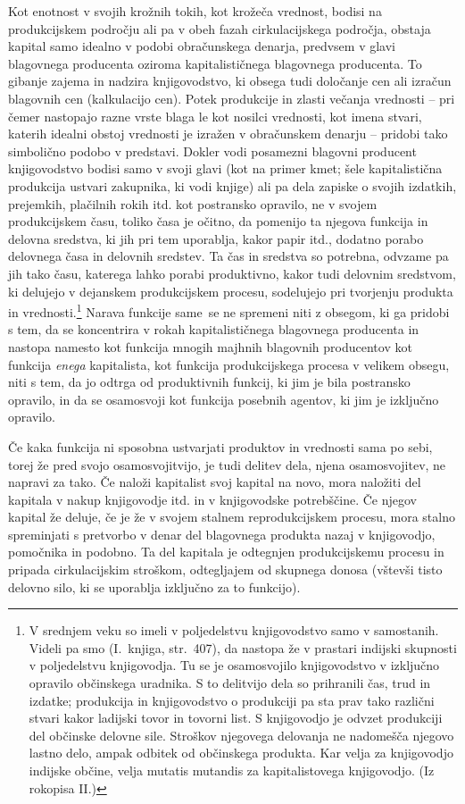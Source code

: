\documentclass[kapital_02.tex]{subfiles}
\begin{document}
Kot enotnost v svojih krožnih tokih, kot krožeča vrednost, bodisi na produkcijskem področju ali pa v obeh fazah cirkulacijskega področja, obstaja kapital samo idealno v podobi obračunskega denarja, predvsem v glavi blagovnega producenta oziroma kapitalističnega blagovnega producenta.
To gibanje zajema in nadzira knjigovodstvo, ki obsega tudi določanje cen ali izračun blagovnih cen (kalkulacijo cen).
Potek produkcije in zlasti večanja vrednosti -- pri čemer nastopajo razne vrste blaga le kot nosilci vrednosti, kot imena stvari, katerih idealni obstoj vrednosti je izražen v obračunskem denarju -- pridobi tako simbolično podobo v predstavi.
Dokler vodi posamezni blagovni producent knjigovodstvo bodisi samo v svoji glavi (kot na primer kmet; šele kapitalistična produkcija ustvari zakupnika, ki vodi knjige) ali pa dela zapiske o svojih izdatkih, prejemkih, plačilnih rokih itd. kot postransko opravilo, ne v svojem produkcijskem času, toliko časa je očitno, da pomenijo ta njegova funkcija in delovna sredstva, ki jih pri tem uporablja, kakor papir itd., dodatno porabo delovnega časa in delovnih sredstev.
Ta čas in sredstva so potrebna, odvzame pa jih tako času, katerega lahko porabi produktivno, kakor tudi delovnim sredstvom, ki delujejo v dejanskem produkcijskem procesu, sodelujejo pri tvorjenju produkta in vrednosti.\footnote
{V srednjem veku so imeli v poljedelstvu knjigovodstvo samo v samostanih.
Videli pa smo (I.\ knjiga, str.\ 407), da nastopa že v prastari indijski skupnosti v poljedelstvu knjigovodja.
Tu se je osamosvojilo knjigovodstvo v izključno opravilo občinskega uradnika.
S to delitvijo dela so prihranili čas, trud in izdatke; produkcija in knjigovodstvo o produkciji pa sta prav tako različni stvari kakor ladijski tovor in tovorni list.
S knjigovodjo je odvzet produkciji del občinske delovne sile.
Stroškov njegovega delovanja ne nadomešča njegovo lastno delo, ampak odbitek od občinskega produkta.
Kar velja za knjigovodjo indijske občine, velja mutatis mutandis za kapitalistovega knjigovodjo. (Iz rokopisa II.)}
Narava funkcije same\KPEstran\ se ne spremeni niti z obsegom, ki ga pridobi s tem, da se koncentrira v rokah kapitalističnega blagovnega producenta in nastopa namesto kot funkcija mnogih majhnih blagovnih producentov kot funkcija \emph{enega} kapitalista, kot funkcija produkcijskega procesa v velikem obsegu, niti s tem, da jo odtrga od produktivnih funkcij, ki jim je bila postransko opravilo, in da se osamosvoji kot funkcija posebnih agentov, ki jim je izključno opravilo.

Če kaka funkcija ni sposobna ustvarjati produktov in vrednosti sama po sebi, torej že pred svojo osamosvojitvijo, je tudi delitev dela, njena osamosvojitev, ne napravi za tako.
Če naloži kapitalist svoj kapital na novo, mora naložiti del kapitala v nakup knjigovodje itd. in v knjigovodske potrebščine.
Če njegov kapital že deluje, če je že v svojem stalnem reprodukcijskem procesu, mora stalno spreminjati s pretvorbo v denar del blagovnega produkta nazaj v knjigovodjo, pomočnika in podobno.
Ta del kapitala je odtegnjen produkcijskemu procesu in pripada cirkulacijskim stroškom, odtegljajem od skupnega donosa (vštevši tisto delovno silo, ki se uporablja izključno za to funkcijo).
\end{document}
